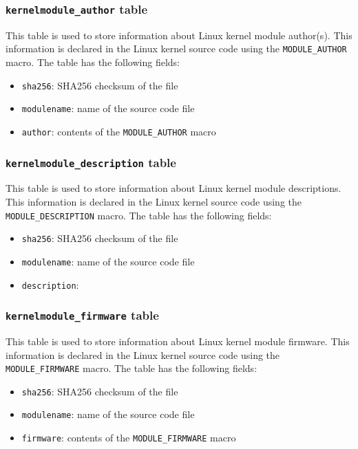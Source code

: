 \documentclass[10pt]{article}
\begin{document}
\subsubsection{\texttt{kernelmodule\_author} table}

This table is used to store information about Linux kernel module author(s).
This information is declared in the Linux kernel source code using the
\texttt{MODULE\_AUTHOR} macro. The table has the following fields:

\begin{itemize}
\item \texttt{sha256}: SHA256 checksum of the file
\item \texttt{modulename}: name of the source code file
\item \texttt{author}: contents of the \texttt{MODULE\_AUTHOR} macro
\end{itemize}

\subsubsection{\texttt{kernelmodule\_description} table}

This table is used to store information about Linux kernel module descriptions.
This information is declared in the Linux kernel source code using the
\texttt{MODULE\_DESCRIPTION} macro. The table has the following fields:

\begin{itemize}
\item \texttt{sha256}: SHA256 checksum of the file
\item \texttt{modulename}: name of the source code file
\item \texttt{description}:
\end{itemize}

\subsubsection{\texttt{kernelmodule\_firmware} table}

This table is used to store information about Linux kernel module firmware.
This information is declared in the Linux kernel source code using the
\texttt{MODULE\_FIRMWARE} macro. The table has the following fields:

\begin{itemize}
\item \texttt{sha256}: SHA256 checksum of the file
\item \texttt{modulename}: name of the source code file
\item \texttt{firmware}: contents of the \texttt{MODULE\_FIRMWARE} macro
\end{itemize}
\end{document}
